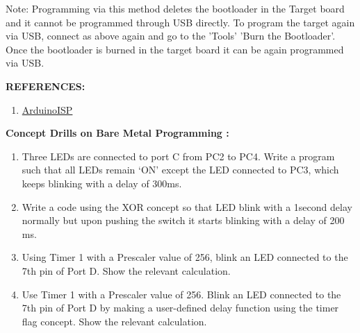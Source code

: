\documentclass[12pt,a4paper]{article}
\begin{document}
\begin{justify}
\noindent Note: Programming via this method deletes the bootloader in the Target board and it cannot be programmed through USB directly. To program the target again via USB, connect as above again and go to the 'Tools' 'Burn the Bootloader'. Once the bootloader is burned in the target board it can be again programmed via USB.
\end{justify}

\vspace{40mm}
\textbf{\large REFERENCES:}
\vspace{-6mm}
\begin{enumerate}
\setlength\itemsep{-0.3em}
\item  \href {https://docs.arduino.cc/built-in-examples/arduino-isp/ArduinoISP}{ArduinoISP }

\end{enumerate}

\textbf{\large Concept Drills on Bare Metal Programming :}

\vspace{-6mm}
\begin{justify}
\begin{enumerate}
 \setlength\itemsep{-0.3em}
\item Three LEDs are connected to port C from PC2 to PC4. Write a program such that all LEDs remain ‘ON’ except the LED connected to PC3, which keeps blinking with a delay of 300ms.
\item Write a code using the XOR concept so that LED blink with a 1second delay normally but upon pushing the switch it starts blinking with a delay of 200 ms.
\item Using Timer 1 with a Prescaler value of 256, blink an LED connected to the 7th pin of Port D. Show the relevant calculation.
\item Use Timer 1 with a Prescaler value of 256. Blink an LED connected to the 7th pin of Port D by making a user-defined delay function using the timer flag concept. Show the relevant calculation.
\end{enumerate}
\end{justify}
\end{document}
